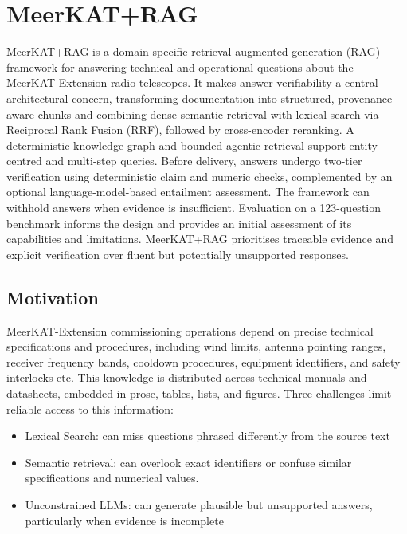 \documentclass[11pt,twoside]{article}
\begin{document}


\section{MeerKAT+RAG}

MeerKAT+RAG is a domain-specific retrieval-augmented generation (RAG) framework for answering technical and operational questions about the MeerKAT-Extension radio telescopes.
It makes answer verifiability a central architectural concern, transforming documentation into structured, provenance-aware chunks and combining dense semantic retrieval with lexical search via Reciprocal Rank Fusion (RRF), followed by cross-encoder reranking.
A deterministic knowledge graph and bounded agentic retrieval support entity-centred and multi-step queries.
Before delivery, answers undergo two-tier verification using deterministic claim and numeric checks, complemented by an optional language-model-based entailment assessment.
The framework can withhold answers when evidence is insufficient.
Evaluation on a 123-question benchmark informs the design and provides an initial assessment of its capabilities and limitations.
MeerKAT+RAG prioritises traceable evidence and explicit verification over fluent but potentially unsupported responses.

\subsection{Motivation}

MeerKAT-Extension commissioning operations depend on precise technical specifications and procedures, including wind limits, antenna pointing ranges, receiver frequency bands, cooldown procedures, equipment identifiers, and safety interlocks etc.
This knowledge is distributed across technical manuals and datasheets, embedded in prose, tables, lists, and figures.
Three challenges limit reliable access to this information:
\begin{itemize}
\item Lexical Search: can miss questions phrased differently from the source text 
\item Semantic retrieval: can overlook exact identifiers or confuse similar specifications and numerical values.
\item Unconstrained LLMs: can generate plausible but unsupported answers, particularly when evidence is incomplete
\end{itemize}
\end{document}
